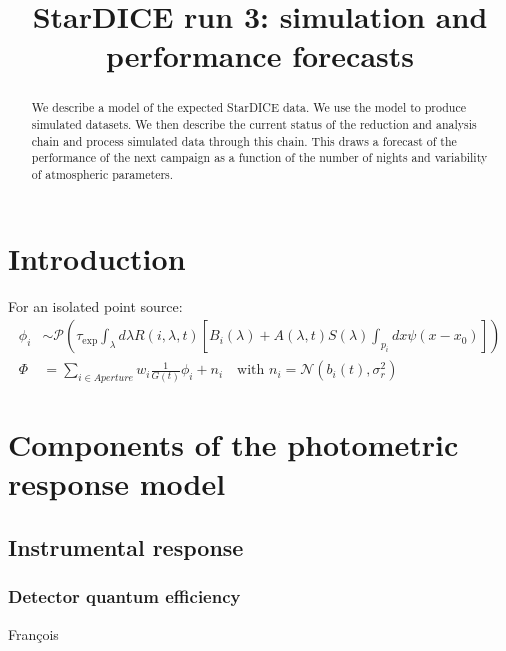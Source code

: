 \documentclass[\docopts]{\docclass}
\begin{document}
\title{ StarDICE run 3: simulation and performance forecasts }

\maketitlepre

\begin{abstract}
  We describe a model of the expected StarDICE data. We use the model
  to produce simulated datasets. We then describe the current status
  of the reduction and analysis chain and process simulated data
  through this chain. This draws a forecast of the performance of the
  next campaign as a function of the number of nights and variability
  of atmospheric parameters.
\end{abstract}


\maketitlepost

% 

\section{Introduction}
\label{sec:intro}

For an isolated point source:
\begin{equation}
  \begin{split}
    \phi_i & \sim \mathcal{P}\left(\tau_\text{exp} \int_{\lambda} d\lambda R(i, \lambda, t) \left[B_i(\lambda) + A(\lambda, t) S(\lambda)\int_{p_i} dx \psi(x - x_0)\right] \right)\\
    \Phi & = \sum_{i \in {Aperture}} w_i \frac1{G(t)} \phi_i + n_i  \quad \text{with } n_i = \mathcal{N}(b_i(t), \sigma_r^2) 
\end{split}
\end{equation}


\section{Components of the photometric response model}
\label{sec:model}

\subsection{Instrumental response}
\label{sec:instrument}

\subsubsection{Detector quantum efficiency }
\label{sec:qe}
François
\end{document}
